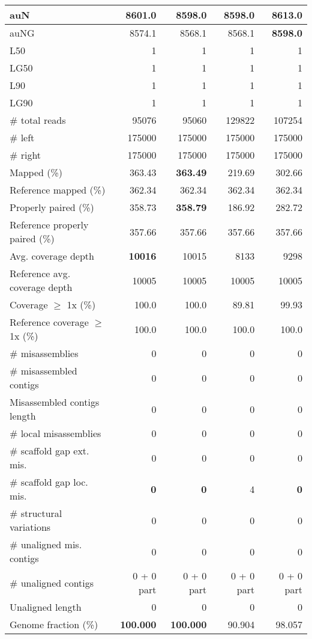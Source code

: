 \documentclass[12pt,a4paper]{article}
\begin{document}
\begin{table}[ht]
\begin{center}
\begin{tabular}{|l*{4}{|r}|}
auN & 8601.0 & 8598.0 & 8598.0 & {\bf 8613.0} \\ \hline
auNG & 8574.1 & 8568.1 & 8568.1 & {\bf 8598.0} \\ \hline
L50 & 1 & 1 & 1 & 1 \\ \hline
LG50 & 1 & 1 & 1 & 1 \\ \hline
L90 & 1 & 1 & 1 & 1 \\ \hline
LG90 & 1 & 1 & 1 & 1 \\ \hline
\# total reads & 95076 & 95060 & 129822 & 107254 \\ \hline
\# left & 175000 & 175000 & 175000 & 175000 \\ \hline
\# right & 175000 & 175000 & 175000 & 175000 \\ \hline
Mapped (\%) & 363.43 & {\bf 363.49} & 219.69 & 302.66 \\ \hline
Reference mapped (\%) & 362.34 & 362.34 & 362.34 & 362.34 \\ \hline
Properly paired (\%) & 358.73 & {\bf 358.79} & 186.92 & 282.72 \\ \hline
Reference properly paired (\%) & 357.66 & 357.66 & 357.66 & 357.66 \\ \hline
Avg. coverage depth & {\bf 10016} & 10015 & 8133 & 9298 \\ \hline
Reference avg. coverage depth & 10005 & 10005 & 10005 & 10005 \\ \hline
Coverage $\geq$ 1x (\%) & 100.0 & 100.0 & 89.81 & 99.93 \\ \hline
Reference coverage $\geq$ 1x (\%) & 100.0 & 100.0 & 100.0 & 100.0 \\ \hline
\# misassemblies & 0 & 0 & 0 & 0 \\ \hline
\# misassembled contigs & 0 & 0 & 0 & 0 \\ \hline
Misassembled contigs length & 0 & 0 & 0 & 0 \\ \hline
\# local misassemblies & 0 & 0 & 0 & 0 \\ \hline
\# scaffold gap ext. mis. & 0 & 0 & 0 & 0 \\ \hline
\# scaffold gap loc. mis. & {\bf 0} & {\bf 0} & 4 & {\bf 0} \\ \hline
\# structural variations & 0 & 0 & 0 & 0 \\ \hline
\# unaligned mis. contigs & 0 & 0 & 0 & 0 \\ \hline
\# unaligned contigs & 0 + 0 part & 0 + 0 part & 0 + 0 part & 0 + 0 part \\ \hline
Unaligned length & 0 & 0 & 0 & 0 \\ \hline
Genome fraction (\%) & {\bf 100.000} & {\bf 100.000} & 90.904 & 98.057 \\ \hline

\end{tabular}
\end{center}
\end{table}
\end{document}
